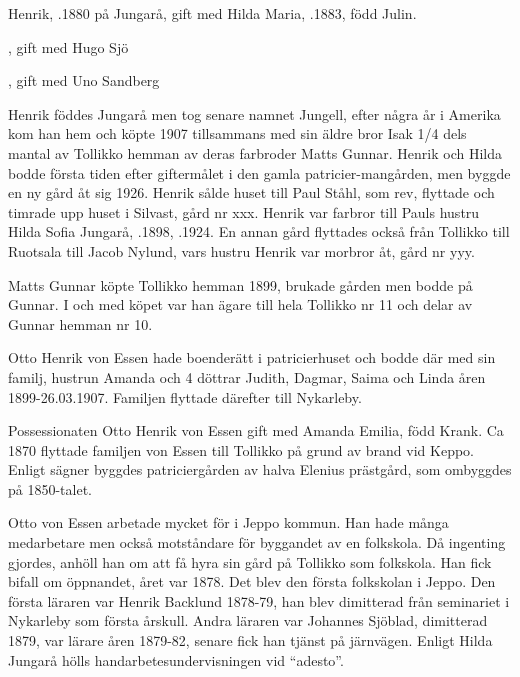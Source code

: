 Henrik, .1880 på Jungarå, gift med Hilda Maria, .1883, född Julin.
\begin{jhchildren}
  \item {}
  \item {}, gift med Hugo Sjö
  \item {}
  \item {}
  \item {}
  \item {}, gift med Uno Sandberg
\end{jhchildren}
Henrik föddes Jungarå men tog senare namnet Jungell, efter några år i Amerika kom han hem och köpte 1907 tillsammans med sin äldre bror Isak 1/4 dels mantal av Tollikko hemman av deras farbroder Matts Gunnar. Henrik och Hilda bodde första tiden efter giftermålet i den gamla patricier-mangården, men byggde en ny gård åt sig 1926. Henrik sålde huset till Paul Ståhl, som rev, flyttade och timrade upp 	huset i Silvast, gård nr xxx. Henrik var farbror till Pauls hustru Hilda Sofia Jungarå, .1898, .1924. En annan gård flyttades också från Tollikko till Ruotsala till Jacob Nylund, vars hustru Henrik var morbror åt, gård nr yyy.




Matts Gunnar köpte Tollikko hemman 1899, brukade gården men bodde på Gunnar. I och med köpet var han ägare till hela Tollikko nr 11 och delar av Gunnar hemman nr 10.


Otto Henrik von Essen hade boenderätt i patricierhuset och bodde där med sin familj, hustrun Amanda och 4 döttrar Judith, Dagmar, Saima och Linda åren 1899-26.03.1907. Familjen flyttade därefter till Nykarleby.

Possessionaten Otto Henrik von Essen gift med Amanda Emilia, född Krank. Ca 1870 flyttade familjen von Essen till Tollikko på grund av brand vid Keppo. Enligt sägner byggdes patriciergården av halva Elenius prästgård, som ombyggdes på 1850-talet.

Otto von Essen arbetade mycket för  i Jeppo kommun. Han hade många medarbetare men också motståndare för byggandet av en folkskola. Då ingenting gjordes, anhöll han om att få hyra sin gård på Tollikko som folkskola. Han fick bifall om öppnandet, året var 1878. Det blev den första folkskolan i Jeppo. Den första läraren var Henrik Backlund 1878-79, han blev dimitterad från seminariet i Nykarleby som första årskull. Andra läraren var Johannes Sjöblad, dimitterad 1879, var lärare åren 1879-82, senare fick han tjänst på järnvägen. Enligt Hilda Jungarå hölls handarbetesundervisningen vid ``adesto''.

